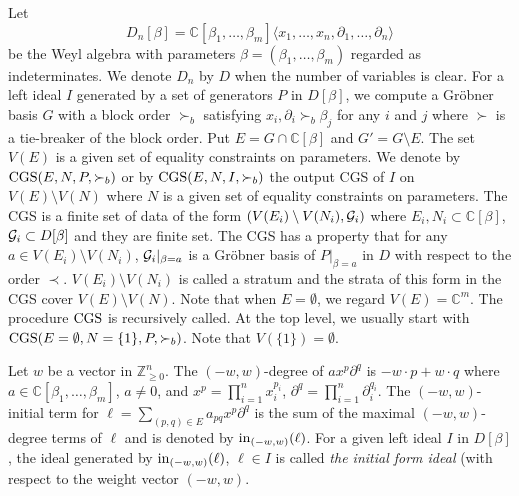 \documentclass{article}
\def\CC{\mathbb{C}}
\def\ZZ{\mathbb{Z}}
\def\pd#1{\partial_{#1}}
\def\CGS{{\rm CGS}}
\newtheorem{example}{Example}
\begin{document}
Let 
$$D_n[\beta]=\CC[\beta_1, \ldots, \beta_m]
  \langle x_1, \ldots, x_n, \pd{1}, \ldots, \pd{n} 
  \rangle
$$
be the Weyl algebra with parameters
$\beta=(\beta_1, \ldots, \beta_m)$
regarded as indeterminates.
We denote $D_n$ by $D$ when the number of variables is clear.
For a left ideal $I$ generated by a set
of generators $P$ in $D[\beta]$,
we compute a Gr\"obner basis $G$ with a block order
$\succ_b$
satisfying $x_i, \pd{i} \succ_b \beta_j$
for any $i$ and $j$
where $\succ$ is a tie-breaker of the block order.
Put $E=G \cap \CC[\beta]$ and $G'=G \setminus E$.
The set $V(E)$ is a given set of equality constraints on parameters.
We denote by $\CGS(E, N, P, \succ_b)$
or by $\CGS(E, N, I, \succ_b)$
the output CGS of $I$ on $V(E) \setminus V(N)$
where $N$ is a given set of equality constraints on parameters.
The CGS is a finite set of data of the form $(V(E_i) \setminus V(N_i), {\cal G}_i)$
where $E_i, N_i \subset \CC[\beta]$, ${\cal G}_i \subset D[\beta]$ and
they are finite set.
The CGS has a property that
for any $a \in V(E_i) \setminus V(N_i)$,
${\cal G}_i |_{\beta=a}$ is a Gr\"obner basis of $P|_{\beta=a}$ in $D$ 
with respect to the order $\prec$.
$V(E_i) \setminus V(N_i)$ is called a stratum %
and the strata of this form in the CGS cover $V(E) \setminus V(N)$.
Note that when $E=\emptyset$, we regard $V(E)=\CC^m$.
The procedure $\CGS$ is recursively called.
At the top level, we usually start with $\CGS(E=\emptyset,N=\{1\},P,\succ_b)$.
Note that $V(\{1\})=\emptyset$.


Let $w$ be a vector in $\ZZ_{\geq 0}^n$.
The $(-w,w)$-degree of $a x^p \pd{}^q$ 
is $-w\cdot p + w \cdot q$
where $a \in \CC[\beta_1, \ldots, \beta_m]$,
$a \not= 0$, and 
$x^p=\prod_{i=1}^n x_i^{p_i}$, 
$\pd{}^q=\prod_{i=1}^n \pd{i}^{q_i}$. 
The $(-w,w)$-initial term for 
$\ell=\sum_{(p,q)\in E} a_{pq} x^p \pd{}^q$
is the sum of the maximal $(-w,w)$-degree terms of $\ell$
and is denoted by 
${\rm in}_{(-w,w)}(\ell)$.
For a given left ideal $I$ in $D[\beta]$,
the ideal generated by ${\rm in}_{(-w,w)}(\ell)$, $\ell \in I$
is called {\it the initial form ideal} (with respect to the weight
vector $(-w,w)$.
\end{document}
